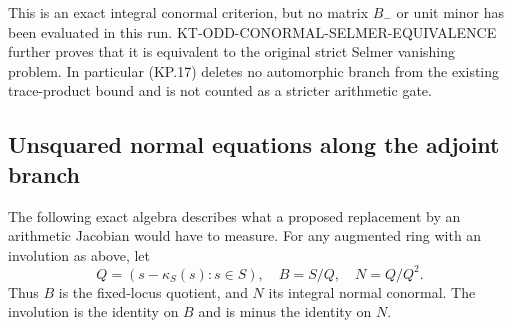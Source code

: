 This is an exact integral conormal criterion, but no
matrix $B_-$ or unit minor has been evaluated in this run.
KT-ODD-CONORMAL-SELMER-EQUIVALENCE further proves that
it is equivalent to the original strict Selmer vanishing
problem.  In particular (KP.17) deletes no automorphic
branch from the existing trace-product bound and is not
counted as a stricter arithmetic gate.

\subsection{Unsquared normal equations along the adjoint branch}

The following exact algebra describes what a proposed
replacement by an arithmetic Jacobian would have to measure.
For any augmented ring with an involution as above, let
\[
 Q=(s-\kappa_S(s):s\in S),\quad B=S/Q,\quad N=Q/Q^2.         \tag{KP.19}
\]
Thus $B$ is the fixed-locus quotient, and $N$ its integral
normal conormal.  The involution is the identity on $B$
and is minus the identity on $N$.

